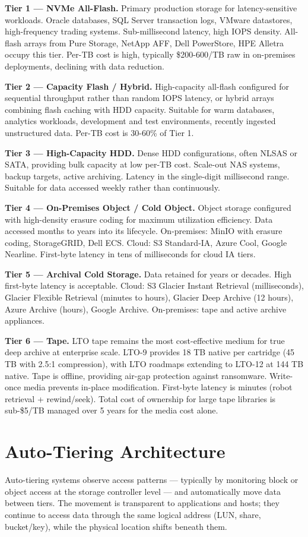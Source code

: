 \textbf{Tier 1 --- NVMe All-Flash.} Primary production storage for latency-sensitive workloads. Oracle databases, SQL Server transaction logs, VMware datastores, high-frequency trading systems. Sub-millisecond latency, high IOPS density. All-flash arrays from Pure Storage, NetApp AFF, Dell PowerStore, HPE Alletra occupy this tier. Per-TB cost is high, typically \$200-600/TB raw in on-premises deployments, declining with data reduction.

\textbf{Tier 2 --- Capacity Flash / Hybrid.} High-capacity all-flash configured for sequential throughput rather than random IOPS latency, or hybrid arrays combining flash caching with HDD capacity. Suitable for warm databases, analytics workloads, development and test environments, recently ingested unstructured data. Per-TB cost is 30-60\% of Tier 1.

\textbf{Tier 3 --- High-Capacity HDD.} Dense HDD configurations, often NLSAS or SATA, providing bulk capacity at low per-TB cost. Scale-out NAS systems, backup targets, active archiving. Latency in the single-digit millisecond range. Suitable for data accessed weekly rather than continuously.

\textbf{Tier 4 --- On-Premises Object / Cold Object.} Object storage configured with high-density erasure coding for maximum utilization efficiency. Data accessed months to years into its lifecycle. On-premises: MinIO with erasure coding, StorageGRID, Dell ECS. Cloud: S3 Standard-IA, Azure Cool, Google Nearline. First-byte latency in tens of milliseconds for cloud IA tiers.

\textbf{Tier 5 --- Archival Cold Storage.} Data retained for years or decades. High first-byte latency is acceptable. Cloud: S3 Glacier Instant Retrieval (milliseconds), Glacier Flexible Retrieval (minutes to hours), Glacier Deep Archive (12 hours), Azure Archive (hours), Google Archive. On-premises: tape and active archive appliances.

\textbf{Tier 6 --- Tape.} LTO tape remains the most cost-effective medium for true deep archive at enterprise scale. LTO-9 provides 18 TB native per cartridge (45 TB with 2.5:1 compression), with LTO roadmaps extending to LTO-12 at 144 TB native. Tape is offline, providing air-gap protection against ransomware. Write-once media prevents in-place modification. First-byte latency is minutes (robot retrieval + rewind/seek). Total cost of ownership for large tape libraries is sub-\$5/TB managed over 5 years for the media cost alone.

\section{Auto-Tiering Architecture}
Auto-tiering systems observe access patterns --- typically by monitoring block or object access at the storage controller level --- and automatically move data between tiers. The movement is transparent to applications and hosts; they continue to access data through the same logical address (LUN, share, bucket/key), while the physical location shifts beneath them.

